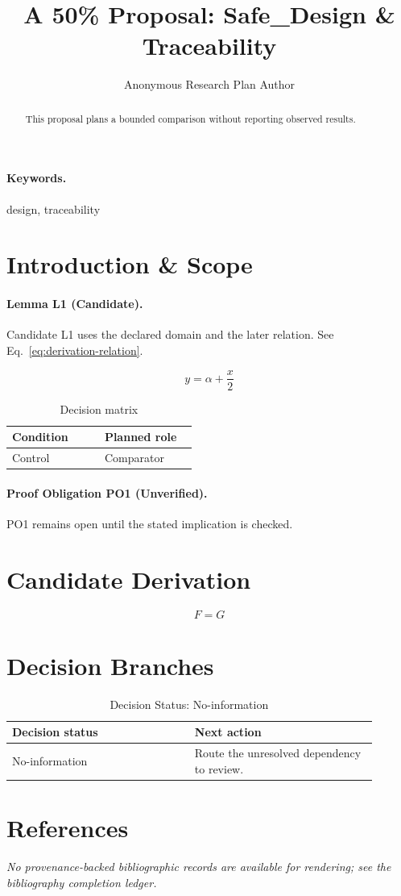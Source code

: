 \documentclass{article}
\title{A 50\% Proposal: Safe\_Design \& Traceability}
\author{Anonymous Research Plan Author}
\begin{document}
\maketitle
\begin{abstract}
This proposal plans a bounded comparison without reporting observed results.
\end{abstract}
\paragraph{Keywords.} design, traceability
\section{Introduction \& Scope}
\paragraph{Lemma L1 (Candidate).} Candidate L1 uses the declared domain and the later relation. See Eq.~\eqref{eq:derivation-relation}.

\begin{equation}
y = \alpha + \frac{x}{2}
\label{eq:introduction-B2}
\end{equation}

\begin{table}[htbp]
\centering
\small


\caption{Decision matrix}
\label{tab:introduction-B3}
\begin{tabular}{|p{0.45\linewidth}|p{0.45\linewidth}|}
\hline
Condition & Planned role \\\hline
Control & Comparator \\\hline
\end{tabular}
\end{table}

\paragraph{Proof Obligation PO1 (Unverified).} PO1 remains open until the stated implication is checked.

\section{Candidate Derivation}
\begin{equation}
F = G
\label{eq:derivation-relation}
\end{equation}

\section{Decision Branches}
\begin{table}[htbp]
\centering
\small


\caption{Decision Status: No-information}
\label{tab:outcomes-no-information}
\begin{tabular}{|p{0.45\linewidth}|p{0.45\linewidth}|}
\hline
Decision status & Next action \\\hline
No-information & Route the unresolved dependency to review. \\\hline
\end{tabular}
\end{table}
\section*{References}
\emph{No provenance-backed bibliographic records are available for rendering; see the bibliography completion ledger.}
\end{document}

